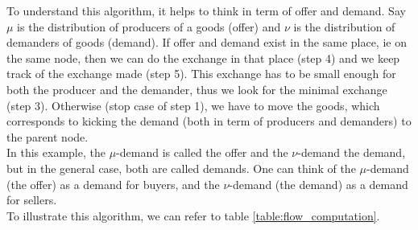 \documentclass{article}
\begin{document}
To understand this algorithm, it helps to think in term of offer and demand. Say $\mu$ is the distribution of producers of a goods (offer) and $\nu$ is the distribution of demanders of goods (demand). If offer and demand exist in the same place, ie on the same node, then we can do the exchange in that place (step 4) and we keep track of the exchange made (step 5). This exchange has to be small enough for both the producer and the demander, thus we look for the minimal exchange (step 3). Otherwise (stop case of step 1), we have to move the goods, which corresponds to kicking the demand (both in term of producers and demanders) to the parent node.\\
In this example, the $\mu$-demand is called the offer and the $\nu$-demand the demand, but in the general case, both are called demands. One can think of the $\mu$-demand (the offer) as a demand for buyers, and the $\nu$-demand (the demand) as a demand for sellers. \\
To illustrate this algorithm, we can refer to table \ref{table:flow_computation}.
\end{document}

